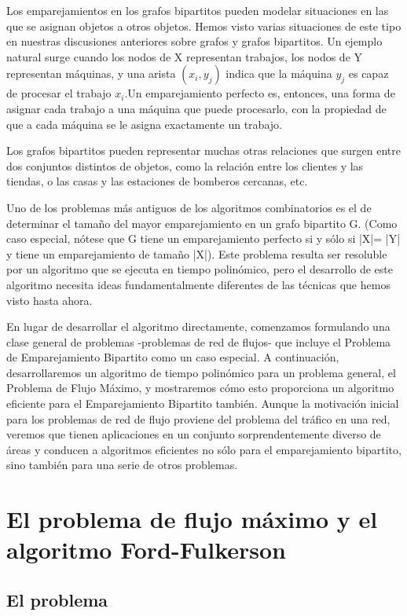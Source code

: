 \documentclass[a4paper, 12pt]{book}
\theoremstyle{dotless}
\begin{document}
Los emparejamientos en los grafos bipartitos pueden modelar situaciones en las que se asignan objetos a otros objetos. Hemos visto varias situaciones de este tipo en nuestras discusiones anteriores sobre grafos y grafos bipartitos. Un ejemplo natural surge cuando los nodos de X representan trabajos, los nodos de Y representan máquinas, y una arista $(x_i, y_j)$ indica que la máquina $y_j$ es capaz de procesar el trabajo $x_i$.Un emparejamiento perfecto es, entonces, una forma de asignar cada trabajo a una máquina que puede procesarlo, con la propiedad de que a cada máquina se le asigna exactamente un trabajo. 

Los grafos bipartitos pueden representar muchas otras relaciones que surgen entre dos conjuntos distintos de objetos, como la relación entre los clientes y las tiendas, o las casas y las estaciones de bomberos cercanas, etc.

Uno de los problemas más antiguos de los algoritmos combinatorios es el de determinar el tamaño del mayor emparejamiento en un grafo bipartito G. (Como caso especial, nótese que G tiene un emparejamiento perfecto si y sólo si |X|= |Y| y tiene un emparejamiento de tamaño |X|). Este problema resulta ser resoluble por un algoritmo que se ejecuta en tiempo polinómico, pero el desarrollo de este algoritmo necesita ideas fundamentalmente diferentes de las técnicas que hemos visto hasta ahora.

En lugar de desarrollar el algoritmo directamente, comenzamos formulando una clase general de problemas -problemas de red de flujos- que incluye el Problema de Emparejamiento Bipartito como un caso especial. 
A continuación, desarrollaremos un algoritmo de tiempo polinómico para un problema general, el Problema de Flujo Máximo, y mostraremos cómo esto proporciona un algoritmo eficiente para el Emparejamiento Bipartito también.
Aunque la motivación inicial para los problemas de red de flujo proviene del problema del tráfico en una red, veremos que tienen aplicaciones en un conjunto sorprendentemente diverso de áreas y conducen a algoritmos eficientes no sólo para el emparejamiento bipartito, sino también para una serie de otros problemas.


\section{El problema de flujo máximo y el algoritmo Ford-Fulkerson}

\subsection*{El problema} 
\end{document}
